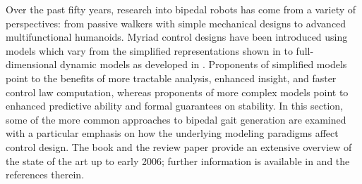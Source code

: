


Over the past fifty years, research into bipedal robots has come from a variety of perspectives: from passive walkers with simple mechanical designs to advanced multifunctional humanoids.
%
Myriad control designs have been introduced using models which vary from the simplified representations shown in  to full-dimensional dynamic models as developed in .
%
Proponents of simplified models point to the benefits of more tractable analysis, enhanced insight, and faster control law computation, whereas proponents of more complex models point to enhanced predictive ability and formal guarantees on stability.
%
In this section, some of the more common approaches to bipedal gait generation are examined with a particular emphasis on how the underlying modeling paradigms affect control design.
%
The book \cite{Westervelt2007} and the review paper \cite{Hurmuzlu2004} provide an extensive overview of the state of the art up to early 2006; further information is available in \cite{Full1999,Holmes2006,Wisse2007,Kuo2007,Siciliano2008,Chevallereau2009,Sadati2012} and the references therein.

